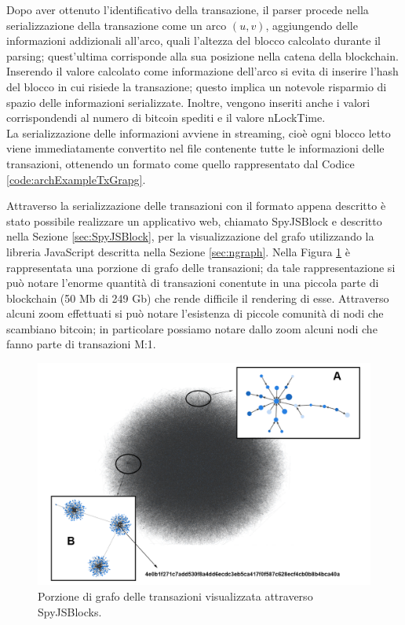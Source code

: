 \begin{example}
Dopo aver ottenuto l'identificativo della transazione, il parser procede nella serializzazione della transazione come un arco $(u, v)$, aggiungendo delle informazioni addizionali all'arco, quali  l'altezza del blocco calcolato durante il parsing; quest'ultima corrisponde alla sua posizione nella catena della blockchain.
Inserendo il valore calcolato come informazione dell'arco si evita di inserire l'hash del blocco in cui risiede la transazione; questo implica un notevole risparmio di spazio delle informazioni serializzate. Inoltre, vengono inseriti anche i valori corrispondendi al numero di bitcoin spediti e il valore nLockTime.\\
La serializzazione delle informazioni avviene in streaming, cioè ogni blocco letto viene immediatamente convertito nel file contenente tutte le informazioni delle transazioni, ottenendo un formato come quello rappresentato dal Codice \ref{code:archExampleTxGrapg}.\\



\end{example}

Attraverso la serializzazione delle transazioni con il formato appena descritto è stato possibile realizzare un applicativo web, chiamato SpyJSBlock e descritto nella Sezione \ref{sec:SpyJSBlock}, per la visualizzazione del grafo utilizzando la libreria JavaScript descritta nella Sezione \ref{sec:ngraph}. Nella Figura \ref{fig:visgraphTx} è rappresentata una porzione di grafo delle transazioni; da tale rappresentazione si può notare  l'enorme quantità di transazioni conentute in una piccola parte di blockchain (50 Mb di 249 Gb) che rende difficile il rendering di esse.
Attraverso alcuni zoom effettuati si può notare l'esistenza di piccole comunità di nodi che scambiano bitcoin; in particolare possiamo notare dallo zoom  alcuni nodi che fanno parte di transazioni M:1.

\begin{figure}
\centering
\includegraphics[scale=0.25]{images/demo/graph_tx_demo_presentation.png}
\caption{Porzione di grafo delle transazioni visualizzata attraverso SpyJSBlocks.}
\label{fig:visgraphTx}
\end{figure}

